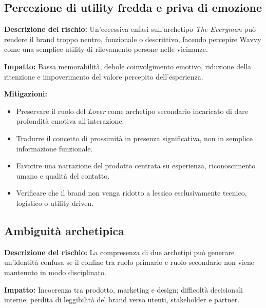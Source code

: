 \documentclass[a4paper, 11pt, table, dvipsnames]{article}
\begin{document}
\subsection{Percezione di utility fredda e priva di
      emozione}

\textbf{Descrizione del rischio:} Un'eccessiva enfasi sull'archetipo
\textit{The Everyman} può rendere il brand troppo neutro,
funzionale o descrittivo, facendo percepire Wavvy come una
semplice utility di rilevamento persone nelle vicinanze.

\textbf{Impatto:} Bassa memorabilità, debole coinvolgimento
emotivo, riduzione della ritenzione e impoverimento del
valore percepito dell'esperienza.

\textbf{Mitigazioni:}
\begin{itemize}
      \item Preservare il ruolo del \textit{Lover} come
            archetipo secondario incaricato di dare profondità
            emotiva all'interazione.

      \item Tradurre il concetto di prossimità in presenza significativa,
            non in semplice informazione funzionale.

      \item Favorire una narrazione del prodotto centrata su esperienza,
            riconoscimento umano e qualità del contatto.

      \item Verificare che il brand non venga ridotto a lessico
            esclusivamente tecnico, logistico o utility-driven.
\end{itemize}

\subsection{Ambiguità archetipica}

\textbf{Descrizione del rischio:} La compresenza di due
archetipi può generare un'identità confusa se il confine
tra ruolo primario e ruolo secondario non viene mantenuto
in modo disciplinato.

\textbf{Impatto:} Incoerenza tra prodotto, marketing e
design; difficoltà decisionali interne; perdita di
leggibilità del brand verso utenti, stakeholder e partner.
\end{document}
